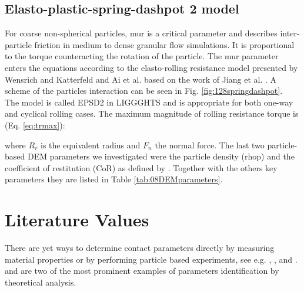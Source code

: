 % 
% 
% 
% 
% 

\subsection{Elasto-plastic-spring-dashpot 2 model}
\label{subsec:epsd2}

For coarse non-spherical particles, \acs{mur} is a critical parameter and describes
inter-particle friction in medium to dense granular flow simulations. 
It is proportional to the 
torque counteracting the rotation of the particle. 
The \acs{mur} parameter enters the 
equations according to the elasto-rolling resistance model presented by Wensrich and 
Katterfeld \cite{RefWorks:87} and Ai et al. \cite{RefWorks:131} 
based on the work of Jiang et al. \cite{RefWorks:143}. 
A scheme of the particles interaction can be seen in Fig.
\ref{fig:128springdashpot}.\\

The model is called EPSD2 in \acs{LIGGGHTS} and is appropriate for both one-way and cyclical rolling cases.
The maximum magnitude of rolling resistance torque is (Eq. \ref{eq:trmax}):



where $R_r$ is the equivalent radius and $F_n$ the normal force.
The last two particle-based \acs{DEM} parameters we investigated were 
the particle density (\acs{rhop})
and the coefficient of restitution (\acs{CoR}) as defined by
\citet{RefWorks:131}.
Together with the others key parameters they are listed in Table
\ref{tab:08DEMparameters}.\\



\section{Literature Values}
\label{sec:literaturevalues}

There are yet ways to determine contact parameters directly by measuring
material properties or by performing particle based experiments, see e.g.
\citet{RefWorks:177}, \citet{RefWorks:181}, and \citet{RefWorks:186}.
\citet{RefWorks:140} and \citet{RefWorks:190}
are two of the most prominent examples of parameters identification by
theoretical analysis. 

